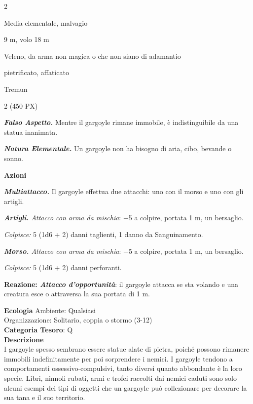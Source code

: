 \begin{multicols}{2}
{
\begin{description}[noitemsep, topsep=0pt, parsep=0pt, partopsep=0pt, itemsep=1pt, leftmargin=2.35cm,  labelwidth=2.2cm, itemindent=0cm, listparindent=0pt] %
\setlength{\baselineskip}{10pt}
\item[\textbf{Taglia/Tipo}] Media elementale, malvagio
\item[\textbf{Caratt.}] 
\item[\textbf{Punti Ferita}] 
\item[\textbf{Movimento}] 9 m, volo 18 m
\item[\textbf{Tiri Salvez.}] 
\item[\textbf{Res. Danni}] Veleno, da arma non magica o che non siano di adamantio
\item[\textbf{Immunità}] pietrificato, affaticato
\item[\textbf{Sensi}] 
\item[\textbf{Linguaggi}] Tremun
\item[\textbf{Sfida}] 2 (450 PX)
\end{description}
\smallskip

\emph{\textbf{Falso Aspetto.}} Mentre il gargoyle rimane immobile, è indistinguibile da una statua inanimata.

\emph{\textbf{Natura Elementale.}} Un gargoyle non ha bisogno di aria, cibo, bevande o sonno.

\textbf{Azioni}

\emph{\textbf{Multiattacco.}} Il gargoyle effettua due attacchi: uno con il morso e uno con gli artigli.

\emph{\textbf{Artigli.} Attacco con arma da mischia}: +5 a colpire, portata 1 m, un bersaglio.

\emph{Colpisce:} 5 (1d6 + 2) danni taglienti, 1 danno da Sanguinamento.

\emph{\textbf{Morso.} Attacco con arma da mischia}: +5 a colpire, portata 1 m, un bersaglio.

\emph{Colpisce:} 5 (1d6 + 2) danni perforanti.

\textbf{Reazione: \emph{Attacco d'opportunità}}: il gargoyle attacca se sta volando e una creatura esce o attraversa la sua portata di 1 m.

\textbf{Ecologia}
Ambiente: Qualsiasi\\
Organizzazione: Solitario, coppia o stormo (3-12)\\
\textbf{Categoria Tesoro}: Q\\
\textbf{Descrizione}\\
I gargoyle spesso sembrano essere statue alate di pietra, poiché possono rimanere immobili indefinitamente per poi sorprendere i nemici. I gargoyle tendono a comportamenti ossessivo-compulsivi, tanto diversi quanto abbondante è la loro specie. Libri, ninnoli rubati, armi e trofei raccolti dai nemici caduti sono solo alcuni esempi dei tipi di oggetti che un gargoyle può collezionare per decorare la sua tana e il suo territorio.

}
\end{multicols}

